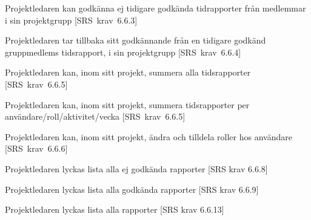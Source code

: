 \documentclass[a4paper]{article}
\begin{document}
\begin{appendices}
\begin{FT}
\item
Projektledaren kan godkänna ej tidigare godkända tidrapporter från medlemmar i sin projektgrupp [SRS~krav~6.6.3]

\item
Projektledaren tar tillbaka sitt godkännande från en tidigare godkänd gruppmedlems tidsrapport, i sin projektgrupp [SRS~krav~6.6.4]

\item
Projektledaren kan, inom sitt projekt, summera alla tidsrapporter [SRS~krav~6.6.5]

\item
Projektledaren kan, inom sitt projekt, summera tidsrapporter per användare/roll/aktivitet/vecka [SRS~krav~6.6.5]

\item
Projektledaren kan, inom sitt projekt, ändra och tilldela roller hos användare [SRS~krav~6.6.6]



\item
Projektledaren lyckas lista alla ej godkända rapporter [SRS krav 6.6.8]

\item
Projektledaren lyckas lista alla godkända rapporter [SRS krav 6.6.9]

\item
Projektledaren lyckas lista alla rapporter [SRS krav 6.6.13]






\end{FT}
\end{appendices}



\newpage
\end{document}
